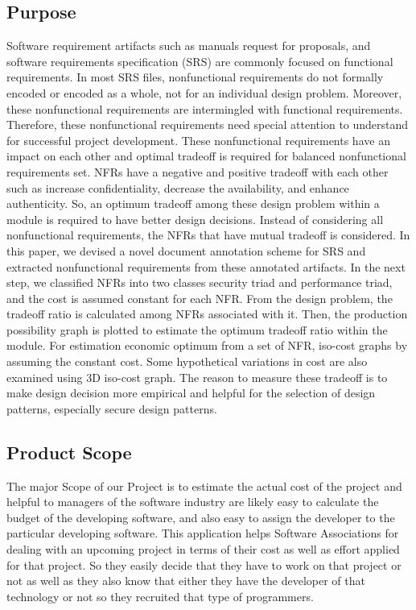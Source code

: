  \subsection{Purpose}
 Software requirement artifacts such as manuals request for proposals, and software requirements specification (SRS) are
 commonly focused on functional requirements. In most SRS files, nonfunctional requirements do not formally encoded or 
 encoded as a whole, not for an individual design problem. Moreover, these nonfunctional requirements are intermingled 
 with functional requirements. Therefore, these nonfunctional requirements need special attention to understand for
 successful project development. These nonfunctional requirements have an impact on each other and optimal tradeoff is
 required for balanced nonfunctional requirements set. NFRs have a negative and positive tradeoff with each other such
 as increase confidentiality, decrease the availability, and enhance authenticity. So, an optimum tradeoff among these 
 design problem within a module is required to have better design decisions. Instead of considering all nonfunctional
 requirements, the NFRs that have mutual tradeoff is considered. In this paper, we devised a novel document annotation
 scheme for SRS and extracted nonfunctional requirements from these annotated artifacts. In the next step, we classified
 NFRs into two classes security triad and performance triad, and the cost is assumed constant for each NFR. From the design
 problem, the tradeoff ratio is calculated among NFRs associated with it. Then, the production possibility graph is plotted
 to estimate the optimum tradeoff ratio within the module. For estimation economic optimum from a set of NFR, iso-cost graphs
 by assuming the constant cost. Some hypothetical variations in cost are also examined using 3D iso-cost graph. The reason to
 measure these tradeoff is to make design decision more empirical and helpful for the selection of design patterns, especially
 secure design patterns.

    \subsection{Product Scope}
    The major Scope of our Project is to estimate the actual cost of the project and helpful to managers of the software industry
    are likely easy to calculate the budget of the developing software, and also easy to assign the developer to the particular 
    developing software. This application helps Software Associations for dealing with an upcoming project in terms of their cost 
    as well as effort applied for that project. So they easily decide that they have to work on that project or not as well as they also
    know that either they have the developer of that technology or not so they recruited that type of programmers.
    \\
    
